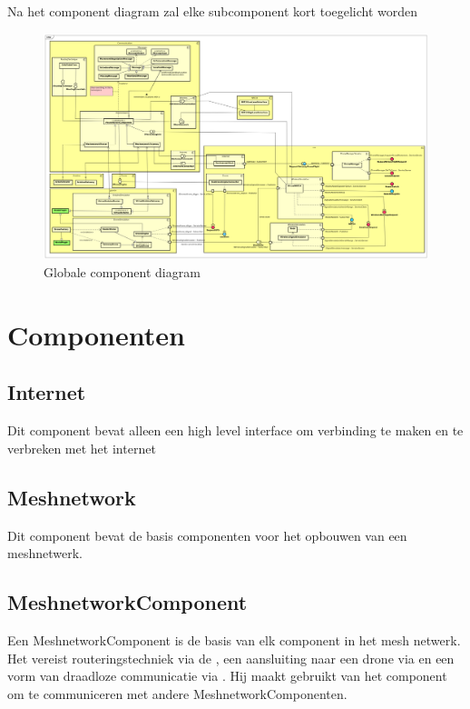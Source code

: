 \documentclass[a4paper, 11pt, oneside]{report}
\begin{document}
Na het component diagram zal elke subcomponent kort toegelicht worden


\begin{landscape}
	\begin{figure}[p]%
		\includegraphics[width=\linewidth]{Afbeeldingen/ComponentDiagram.png}%
		\caption{Globale component diagram}
			\label{fig:componentdiagram}
	\end{figure}%
\clearpage
\end{landscape}
\clearpage



\section{Componenten}
\label{architectural:subcomponenten}

\subsection{Internet}
\label{architectural:subcomponenten:Internet}
Dit component bevat alleen een high level interface om verbinding te maken en te verbreken met het internet
\subsection{Meshnetwork}
\label{architectural:subcomponenten:Meshnetwork}
Dit component bevat de basis componenten voor het opbouwen van een meshnetwerk.
\subsection{MeshnetworkComponent}

\label{architectural:subcomponenten:MeshnetworkComponent}
Een MeshnetworkComponent is de basis van elk component in het mesh netwerk.
Het vereist routeringstechniek via de , een aansluiting naar een drone via  en een vorm van draadloze communicatie via .
Hij maakt gebruikt van het component  om te communiceren met andere MeshnetworkComponenten.
 
\end{document}
